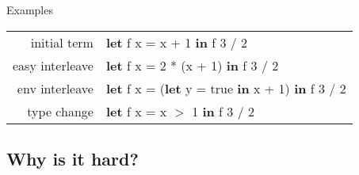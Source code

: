\documentclass{beamer}
\theoremstyle{example}
\begin{document}
\begin{frame}[fragile]{\textcolor{greenish}{Examples}}
    \begin{center}
      \begin{tabular}{r|l}
      \textcolor{greenish}{initial term} &
      \textsf{\large\textbf{let} f x = x + 1
        \textbf{in} f 3 / 2} \\[2em]\pause
      \textcolor{greenish}{easy interleave} &
      \textsf{\large\textbf{let} f x = \alert{2 *} (x + 1) \textbf{in}
        f 3 / 2} \\[2em]\pause
      \textcolor{greenish}{env interleave} &
      \textsf{\large\textbf{let} f x =
        (\alert{\textbf{let} y = true \textbf{in}} x + 1) \textbf{in}
        f 3 / 2} \\[2em]\pause
      \textcolor{greenish}{type change} &
      \textsf{\large\textbf{let} f x = x \alert{$>$} 1 \textbf{in} f 3 / 2}
    \end{tabular}
    \end{center}
\end{frame}

\subsection{Why is it hard?}
\end{document}
